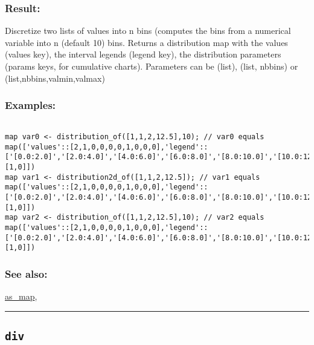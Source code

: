 \documentclass[]{book}
\theoremstyle{definition}
\theoremstyle{definition}
\theoremstyle{definition}
\theoremstyle{remark}
\begin{document}
\subsubsection{Result:}\label{result-135}

Discretize two lists of values into n bins (computes the bins from a
numerical variable into n (default 10) bins. Returns a distribution map
with the values (values key), the interval legends (legend key), the
distribution parameters (params keys, for cumulative charts). Parameters
can be (list), (list, nbbins) or (list,nbbins,valmin,valmax)

\subsubsection{Examples:}\label{examples-106}

\begin{verbatim}
 
map var0 <- distribution_of([1,1,2,12.5],10); // var0 equals map(['values'::[2,1,0,0,0,0,1,0,0,0],'legend'::['[0.0:2.0]','[2.0:4.0]','[4.0:6.0]','[6.0:8.0]','[8.0:10.0]','[10.0:12.0]','[12.0:14.0]','[14.0:16.0]','[16.0:18.0]','[18.0:20.0]'],'parlist'::[1,0]]) 
map var1 <- distribution2d_of([1,1,2,12.5]); // var1 equals map(['values'::[2,1,0,0,0,0,1,0,0,0],'legend'::['[0.0:2.0]','[2.0:4.0]','[4.0:6.0]','[6.0:8.0]','[8.0:10.0]','[10.0:12.0]','[12.0:14.0]','[14.0:16.0]','[16.0:18.0]','[18.0:20.0]'],'parlist'::[1,0]]) 
map var2 <- distribution_of([1,1,2,12.5],10); // var2 equals map(['values'::[2,1,0,0,0,0,1,0,0,0],'legend'::['[0.0:2.0]','[2.0:4.0]','[4.0:6.0]','[6.0:8.0]','[8.0:10.0]','[10.0:12.0]','[12.0:14.0]','[14.0:16.0]','[16.0:18.0]','[18.0:20.0]'],'parlist'::[1,0]])
\end{verbatim}

\subsubsection{See also:}\label{see-also-83}

\href{OperatorsAA\#as_map}{as\_map},

\begin{center}\rule{0.5\linewidth}{\linethickness}\end{center}

\subsection{\texorpdfstring{\texttt{div}}{div}}\label{div}
\end{document}
